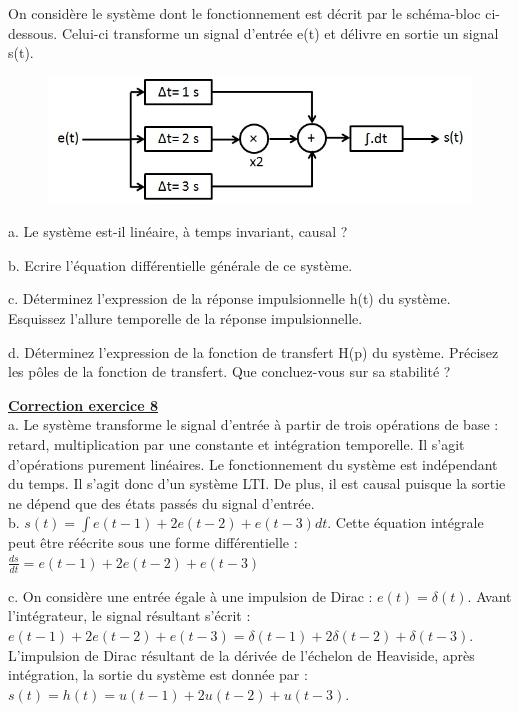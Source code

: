 \documentclass[11pt]{report}
\begin{document}
 	On considère le système dont le fonctionnement est décrit par le schéma-bloc ci-dessous. Celui-ci transforme un signal d'entrée e(t) et délivre en sortie un signal s(t). 
 	
 	\begin{figure}[h!]
 		\centering
 		\includegraphics[scale=0.5]{images/Exo_2_6.jpg} 
 	\end{figure}
 
 	a. Le système est-il linéaire, à temps invariant, causal ?
 	
 	b. Ecrire l'équation différentielle générale de ce système.
 	
 	c. Déterminez l'expression de la réponse impulsionnelle h(t) du système. Esquissez l'allure temporelle de la réponse impulsionnelle. 
 	
 	d. Déterminez l'expression de la fonction de transfert H(p) du système. Précisez les pôles de la fonction de transfert. Que concluez-vous sur sa stabilité ?
 
 	\vspace{1\baselineskip}
 	
 		\textbf{\underline{Correction exercice 8}}\\
 	a. Le système transforme le signal d'entrée à partir de trois opérations de base : retard, multiplication par une constante et intégration temporelle. Il s'agit d'opérations purement linéaires. Le fonctionnement du système est indépendant du temps. Il s'agit donc d'un système LTI. De plus, il est causal puisque la sortie ne dépend que des états passés du signal d'entrée.\\
 	
 	b. $s(t)=\int e(t-1)+2e(t-2)+e(t-3) dt$. Cette équation intégrale peut être réécrite sous une forme différentielle : $\frac{ds}{dt}=e(t-1)+2e(t-2)+e(t-3)$ 
 	
 	c. On considère une entrée égale à une impulsion de Dirac : $e(t) = \delta(t)$.	Avant l'intégrateur, le signal résultant s'écrit : $e(t-1)+2e(t-2)+e(t-3)=\delta(t-1)+2\delta(t-2)+\delta(t-3)$. L'impulsion de Dirac résultant de la dérivée de l'échelon de Heaviside, après intégration, la sortie du système est donnée par : $s(t) = h(t) = u(t-1)+2u(t-2)+u(t-3)$.\\
 	
\end{document}
